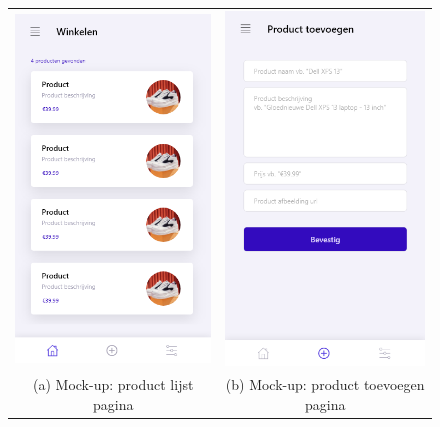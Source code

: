 \begin{figure}
    \begin{tabular}{cc}
        \includegraphics[width=65mm]{img/methodologie/mock-home_screen.png} &   \includegraphics[width=65mm]{img/methodologie/mock-add_product_screen.png} \\
        (a) Mock-up: product lijst pagina & (b) Mock-up: product toevoegen pagina\\[6pt]

\end{tabular}
\end{figure}
